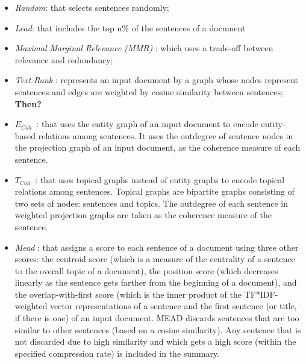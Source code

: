 \begin{itemize}
	\item \emph{Random}: that selects sentences randomly;

	\item \emph{Lead}: that includes the top n\% of the sentences of a document

	\item \emph{Maximal Marginal Relevance (MMR)} \cite{carbonell98}: which uses a \mbox{trade-off} between relevance and redundancy; 

	\item \emph{Text-Rank} \cite{mihalcea04b}: represents an input document by a graph whose nodes represent sentences and edges are weighted by cosine similarity between sentences; 
	\textbf{Then?}

	\item \emph{$E_{Coh}$}\ \cite{parveen15a}: that uses the entity graph of an input document to encode \mbox{entity-based} relations among sentences. 
	It uses the outdegree of sentence nodes in the projection graph of an input document, as the coherence measure of each sentence.

	\item \emph{$T_{Coh}$}\ \cite{parveen15b}: that uses topical graphs instead of entity graphs to encode topical relations among sentences. 
	Topical graphs are bipartite graphs consisting of two sets of nodes: sentences and topics. 
	The outdegree of each sentence in weighted projection graphs are taken as the coherence measure of the sentence.

	\item \emph{Mead} \cite{radev04b}: that assigns a score to each sentence of a document using three other scores: the centroid score (which is a measure of the centrality of a sentence to the overall topic of a document), the position score (which  decreases linearly as the sentence gets farther from the beginning of a document), and the \mbox{overlap-with-first} score (which is the inner product of the \mbox{TF*IDF-weighted} vector representations of a sentence and the first sentence (or title, if there is one) of an input document. 
	MEAD discards sentences that are too similar to other sentences (based on a cosine similarity). 
	Any sentence that is not discarded due to high similarity and which gets a high score (within the specified compression rate) is included in the summary. 
	
\end{itemize}


